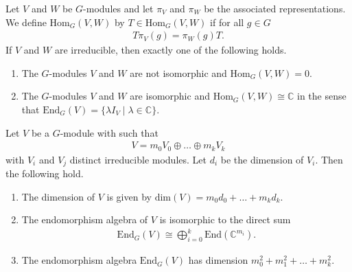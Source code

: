 \begin{lemma}\label{lem:schurs-lemma}
    Let $V$ and $W$ be $G$-modules and let $\pi_V$ and $\pi_W$ be the associated representations.
    We define $\mathrm{Hom}_G(V, W)$ by $T \in \mathrm{Hom}_G(V, W)$ if for all $g \in G$
    \begin{align}
        T \pi_V(g) = \pi_W(g) T.
    \end{align}
    If $V$ and $W$ are irreducible, then exactly one of the following holds.
    \begin{enumerate}
        \item The $G$-modules $V$ and $W$ are not isomorphic and $\mathrm{Hom}_G(V,W) = 0$.
        \item The $G$-modules $V$ and $W$ are isomorphic and $\mathrm{Hom}_G(V,W) \cong \mathbb{C}$ in the sense that $\mathrm{End}_G(V) = \{ \lambda I_V \mid \lambda \in \mathbb{C} \}$.
    \end{enumerate}
\end{lemma}

\begin{cor}
    Let $V$ be a $G$-module with such that
    \begin{align}
        V = m_0 V_0 \oplus \dots \oplus m_k V_k
    \end{align}
    with $V_i$ and $V_j$ distinct irreducible modules.
    Let $d_i$ be the dimension of $V_i$.
    Then the following hold.
    \begin{enumerate}
        \item The dimension of $V$ is given by $\mathrm{dim}(V) = m_0 d_0 + \dots + m_k d_k$.
        \item \label{item:artin-wedderburn} The endomorphism algebra of $V$ is isomorphic to the direct sum
        \begin{align}
            \mathrm{End}_G(V) \cong \bigoplus_{i = 0}^k \mathrm{End}(\mathbb{C}^{m_i}).
        \end{align}
        \item The endomorphism algebra $\mathrm{End}_G(V)$ has dimension $m_0^2 + m_1^2 + \dots + m_k^2$.
    \end{enumerate}
\end{cor}

